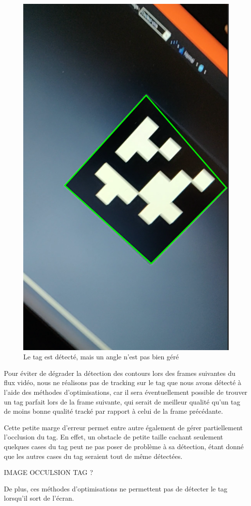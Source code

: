        \begin{figure}[!h]
            \centering
            \includegraphics[scale=0.25]{img/cropped_tag.png}
            \caption{Le tag est détecté, mais un angle n'est pas bien géré}
        \end{figure}

        Pour éviter de dégrader la détection des contours lors des frames suivantes du flux vidéo, nous ne réalisons pas de tracking sur le tag que nous avons détecté à l'aide des méthodes d'optimisations, car il sera éventuellement possible de trouver un tag parfait lors de la frame suivante, qui serait de meilleur qualité qu'un tag de moins bonne qualité tracké par rapport à celui de la frame précédante.

        Cette petite marge d'erreur permet entre autre également de gérer partiellement l'occlusion du tag. En effet, un obstacle de petite taille cachant seulement quelques cases du tag peut ne pas poser de problème à sa détection, étant donné que les autres cases du tag seraient tout de même détectées.

        IMAGE OCCULSION TAG ? 

        De plus, ces méthodes d'optimisations ne permettent pas de détecter le tag lorsqu'il sort de l'écran.